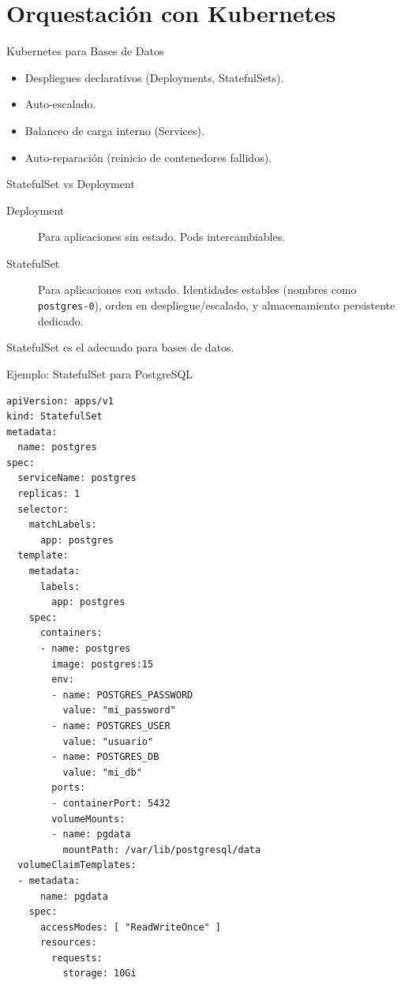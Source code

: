 \documentclass[aspectratio=169, 10pt, xcolor=table]{beamer}
\begin{document}
\section{Orquestación con Kubernetes}

\begin{frame}{Kubernetes para Bases de Datos}
    \begin{itemize}
        \item Despliegues declarativos (Deployments, StatefulSets).
        \item Auto-escalado.
        \item Balanceo de carga interno (Services).
        \item Auto-reparación (reinicio de contenedores fallidos).
    \end{itemize}
\end{frame}

\begin{frame}{StatefulSet vs Deployment}
    \begin{description}
        \item[Deployment] Para aplicaciones sin estado. Pods intercambiables.
        \item[StatefulSet] Para aplicaciones con estado. Identidades estables (nombres como \texttt{postgres-0}), orden en despliegue/escalado, y almacenamiento persistente dedicado.
    \end{description}
    \alert{StatefulSet es el adecuado para bases de datos.}
\end{frame}

\begin{frame}[fragile]{Ejemplo: StatefulSet para PostgreSQL}
    \begin{lstlisting}[style=yamlstyle]
apiVersion: apps/v1
kind: StatefulSet
metadata:
  name: postgres
spec:
  serviceName: postgres
  replicas: 1
  selector:
    matchLabels:
      app: postgres
  template:
    metadata:
      labels:
        app: postgres
    spec:
      containers:
      - name: postgres
        image: postgres:15
        env:
        - name: POSTGRES_PASSWORD
          value: "mi_password"
        - name: POSTGRES_USER
          value: "usuario"
        - name: POSTGRES_DB
          value: "mi_db"
        ports:
        - containerPort: 5432
        volumeMounts:
        - name: pgdata
          mountPath: /var/lib/postgresql/data
  volumeClaimTemplates:
  - metadata:
      name: pgdata
    spec:
      accessModes: [ "ReadWriteOnce" ]
      resources:
        requests:
          storage: 10Gi
    \end{lstlisting}
\end{frame}
\end{document}
